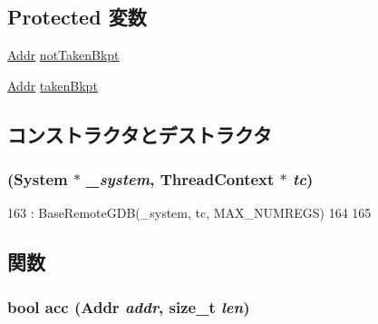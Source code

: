 \subsection*{Protected 変数}
\begin{DoxyCompactItemize}
\item 
\hyperlink{classm5_1_1params_1_1Addr}{Addr} \hyperlink{classArmISA_1_1RemoteGDB_ae1a0a563a724aaffa8ae5b4095957aa4}{notTakenBkpt}
\item 
\hyperlink{classm5_1_1params_1_1Addr}{Addr} \hyperlink{classArmISA_1_1RemoteGDB_abfdbe67e311a613bbbe39b730279f3e1}{takenBkpt}
\end{DoxyCompactItemize}


\subsection{コンストラクタとデストラクタ}
\hypertarget{classArmISA_1_1RemoteGDB_a378793e7a68420568b51f355b7e8c473}{
\subsubsection[{RemoteGDB}]{ ({\bf System} $\ast$ {\em \_\-system}, \/  {\bf ThreadContext} $\ast$ {\em tc})}}
\label{classArmISA_1_1RemoteGDB_a378793e7a68420568b51f355b7e8c473}



\begin{DoxyCode}
163     : BaseRemoteGDB(_system, tc, MAX_NUMREGS)
164 {
165 }
\end{DoxyCode}


\subsection{関数}
\hypertarget{classArmISA_1_1RemoteGDB_ac4c7be164f087f2f53d137d9768809a7}{
\subsubsection[{acc}]{\setlength{\rightskip}{0pt plus 5cm}bool acc ({\bf Addr} {\em addr}, \/  size\_\-t {\em len})}}
\label{classArmISA_1_1RemoteGDB_ac4c7be164f087f2f53d137d9768809a7}



